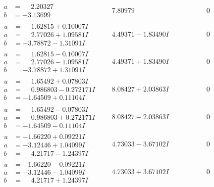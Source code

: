 \documentclass[1p]{elsarticle_modified}
\theoremstyle{definition}
\begin{document}
$$\begin{array}{c|c|c}
\begin{aligned}
a &= \phantom{-}2.20327\phantom{ +0.000000I} \\
b &= -3.13699\phantom{ +0.000000I}\end{aligned}
 & \phantom{-}7.80979\phantom{ +0.000000I} & \phantom{-0.000000 } 0 \\ \hline\begin{aligned}
u &= \phantom{-}1.62815 + 0.10007 I \\
a &= \phantom{-}2.77026 + 1.09581 I \\
b &= -3.78872 - 1.31091 I\end{aligned}
 & \phantom{-}4.49371 - 1.83490 I & \phantom{-0.000000 } 0 \\ \hline\begin{aligned}
u &= \phantom{-}1.62815 - 0.10007 I \\
a &= \phantom{-}2.77026 - 1.09581 I \\
b &= -3.78872 + 1.31091 I\end{aligned}
 & \phantom{-}4.49371 + 1.83490 I & \phantom{-0.000000 } 0 \\ \hline\begin{aligned}
u &= \phantom{-}1.65492 + 0.07803 I \\
a &= \phantom{-}0.986803 - 0.272171 I \\
b &= -1.64509 + 0.11104 I\end{aligned}
 & \phantom{-}8.08427 + 2.03863 I & \phantom{-0.000000 } 0 \\ \hline\begin{aligned}
u &= \phantom{-}1.65492 - 0.07803 I \\
a &= \phantom{-}0.986803 + 0.272171 I \\
b &= -1.64509 - 0.11104 I\end{aligned}
 & \phantom{-}8.08427 - 2.03863 I & \phantom{-0.000000 } 0 \\ \hline\begin{aligned}
u &= -1.66220 + 0.09221 I \\
a &= -3.12446 + 1.04099 I \\
b &= \phantom{-}4.21717 - 1.24397 I\end{aligned}
 & \phantom{-}4.73033 - 3.67102 I & \phantom{-0.000000 } 0 \\ \hline\begin{aligned}
u &= -1.66220 - 0.09221 I \\
a &= -3.12446 - 1.04099 I \\
b &= \phantom{-}4.21717 + 1.24397 I\end{aligned}
 & \phantom{-}4.73033 + 3.67102 I & \phantom{-0.000000 } 0 \\ \hline\begin{aligned}

\end{aligned}
\end{array}$$
\end{document}
